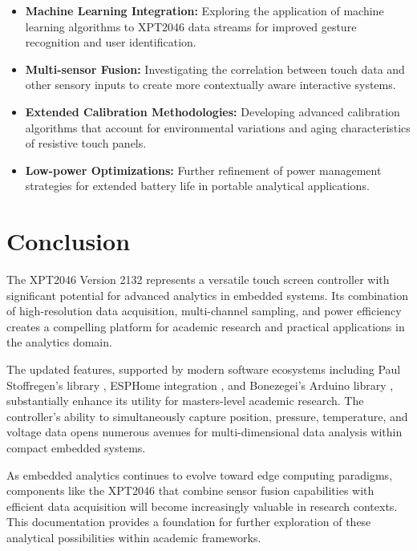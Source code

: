 \begin{itemize}
	\item \textbf{Machine Learning Integration:} Exploring the application of machine learning algorithms to XPT2046 data streams for improved gesture recognition and user identification.
	
	\item \textbf{Multi-sensor Fusion:} Investigating the correlation between touch data and other sensory inputs to create more contextually aware interactive systems.
	
	\item \textbf{Extended Calibration Methodologies:} Developing advanced calibration algorithms that account for environmental variations and aging characteristics of resistive touch panels.
	
	\item \textbf{Low-power Optimizations:} Further refinement of power management strategies for extended battery life in portable analytical applications.
\end{itemize}

\section{Conclusion}
The XPT2046 Version 2132 represents a versatile touch screen controller with significant potential for advanced analytics in embedded systems. Its combination of high-resolution data acquisition, multi-channel sampling, and power efficiency creates a compelling platform for academic research and practical applications in the analytics domain.

The updated features, supported by modern software ecosystems including Paul Stoffregen's library \cite{Stoffregen:2023}, ESPHome integration \cite{ESPHome:2024}, and Bonezegei's Arduino library \cite{Bonezegei:2024}, substantially enhance its utility for masters-level academic research. The controller's ability to simultaneously capture position, pressure, temperature, and voltage data opens numerous avenues for multi-dimensional data analysis within compact embedded systems.

As embedded analytics continues to evolve toward edge computing paradigms, components like the XPT2046 that combine sensor fusion capabilities with efficient data acquisition will become increasingly valuable in research contexts. This documentation provides a foundation for further exploration of these analytical possibilities within academic frameworks.